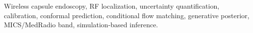 \documentclass[journal]{IEEEtran}
\begin{document}
\begin{IEEEkeywords}
Wireless capsule endoscopy, RF localization, uncertainty quantification,
calibration, conformal prediction, conditional flow matching, generative
posterior, MICS/MedRadio band, simulation-based inference.
\end{IEEEkeywords}











\end{document}
